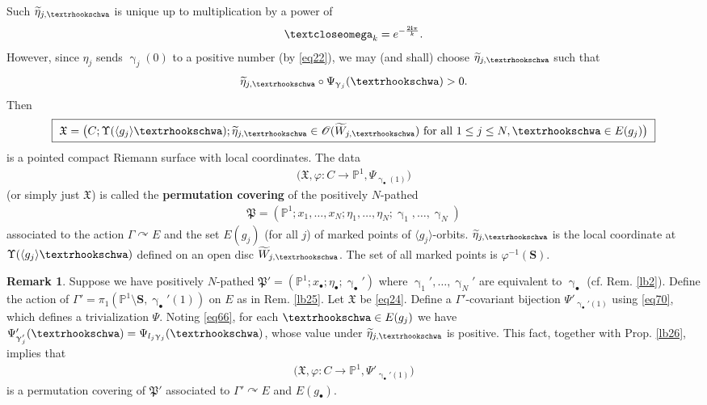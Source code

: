 \documentclass[11pt,b5paper,notitlepage]{article}
\theoremstyle{definition}
\newtheorem{rem}[df]{Remark}
\theoremstyle{plain}
\newcommand{\fk}{\mathfrak}
\newcommand{\wtd}{\widetilde}
\newcommand{\bk}[1]{\langle {#1}\rangle}
\newcommand{\scr}{\mathscr}
\newcommand{\im}{\mathbf{i}}
\newcommand{\blt}{\bullet}
\newcommand{\Pbb}{\mathbb P}
\newcommand{\Sbf}{\mathbf{S}}
\newcommand{\tipaomega}{\text{\textcloseomega}}
\newcommand{\tipae}{\text{\textrhookschwa}}
\numberwithin{equation}{subsection}
\begin{document}
Such $\wtd\eta_{j,\tipae}$ is unique up to multiplication by a power of \index{zz@$\tipaomega_k=e^{-\frac{2\im\pi}k}$}
\begin{align}
	\tipaomega_k=e^{-\frac{2\im\pi}k}.	
\end{align}
However, since $\eta_j$ sends $\upgamma_j(0)$ to a positive number (by \eqref{eq22}), we may (and shall) choose $\wtd\eta_{j,\tipae}$ such that
\begin{align}
	\wtd\eta_{j,\tipae}\circ\Psi_{\upgamma_j}(\tipae)>0.	\label{eq28}
\end{align}
Then
\begin{align}
	\boxed{~\fk X=	\big(C;\Upsilon(\bk{g_j}\tipae);\wtd\eta_{j,\tipae}\in\scr O(\wtd W_{j,\tipae})\text{ for all }1\leq j\leq N,\tipae\in E(g_j)\big)~}\label{eq24}
\end{align}
is a pointed compact Riemann surface with local coordinates. The data
\begin{align*}
\big(\fk X,\varphi:C\rightarrow\Pbb^1,\Psi_{\upgamma_\blt(1)}\big)	
\end{align*}
(or simply just $\fk X$) is  called the \textbf{permutation covering} of the positively $N$-pathed 
\begin{align*}
	\boxed{~\fk P=(\Pbb^1;x_1,\dots,x_N;\eta_1,\dots,\eta_N;\upgamma_1,\dots,\upgamma_N)~}
\end{align*}
associated to the action $\Gamma\curvearrowright E$ and the set  $E(g_j)$ (for all $j$) of marked points of $\bk{g_j}$-orbits. $\wtd\eta_{j,\tipae}$ is the local coordinate at $\Upsilon(\bk{g_j}\tipae)$ defined on an open disc $\wtd W_{j,\tipae}$. The set of all marked points is $\varphi^{-1}(\Sbf)$.



\begin{rem}\label{lb27}
Suppose we have positively $N$-pathed $\fk P'=(\Pbb^1;x_\blt;\eta_\blt;\upgamma_\blt')$ where $\upgamma_1',\dots,\upgamma_N'$ are equivalent to $\upgamma_\blt$ (cf. Rem. \ref{lb2}). Define the action of $\Gamma'=\pi_1(\Pbb^1\setminus\Sbf,\upgamma_\blt'(1))$ on $E$ as in  Rem. \ref{lb25}. Let $\fk X$ be \eqref{eq24}. Define a $\Gamma'$-covariant bijection $\Psi'_{\upgamma_\blt'(1)}$ using \eqref{eq70}, which defines a trivialization $\Psi$. Noting \eqref{eq66}, for each $\tipae\in E(g_j)$ we have $\Psi'_{\upgamma_j'}(\tipae)=\Psi_{l_j\upgamma_j}(\tipae)$, whose value under $\wtd\eta_{j,\tipae}$ is positive. This fact, together with Prop. \ref{lb26}, implies that
\begin{align*}
\big(\fk X,\varphi:C\rightarrow\Pbb^1,\Psi'_{\upgamma_\blt'(1)}\big)
\end{align*}
is a permutation covering of $\fk P'$ associated to $\Gamma'\curvearrowright E$ and $E(g_\blt)$. 
\end{rem}
\end{document}
